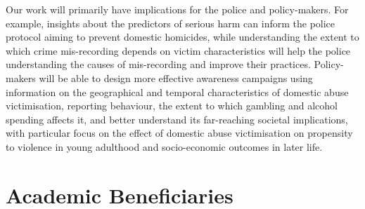 \documentclass[11pt, a4paper]{article}
\begin{document}
 

Our work will primarily have implications for the police and policy-makers. For example, insights about the predictors of serious harm can inform the police protocol aiming to prevent domestic homicides, while understanding the extent to which crime mis-recording depends on victim characteristics will help the police understanding the causes of mis-recording and improve their practices. Policy-makers will be able to design more effective awareness campaigns using information on the geographical and temporal characteristics of domestic abuse victimisation, reporting behaviour, the extent to which gambling and alcohol spending affects it, and better understand its far-reaching societal implications, with particular focus on the effect of domestic abuse victimisation on propensity to violence in young adulthood and socio-economic outcomes in later life. 


\section{Academic Beneficiaries}

%
%
%
%
%
%
%
%
%
%
%
%
%
%
%
\end{document}
